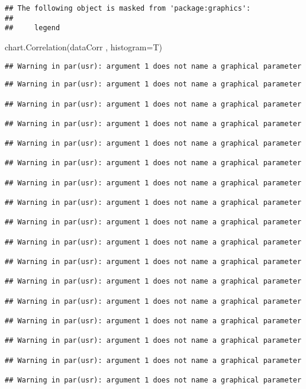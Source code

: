 \documentclass[
]{article}
\newenvironment{Shaded}{\begin{snugshade}}{\end{snugshade}}
\newcommand{\AttributeTok}[1]{\textcolor[rgb]{0.77,0.63,0.00}{#1}}
\newcommand{\FunctionTok}[1]{\textcolor[rgb]{0.00,0.00,0.00}{#1}}
\newcommand{\NormalTok}[1]{#1}
\begin{document}
\begin{verbatim}
## The following object is masked from 'package:graphics':
## 
##     legend
\end{verbatim}

\begin{Shaded}
\begin{Highlighting}[]
\FunctionTok{chart.Correlation}\NormalTok{(dataCorr , }\AttributeTok{histogram=}\NormalTok{T)}
\end{Highlighting}
\end{Shaded}

\begin{verbatim}
## Warning in par(usr): argument 1 does not name a graphical parameter
\end{verbatim}

\begin{verbatim}
## Warning in par(usr): argument 1 does not name a graphical parameter

## Warning in par(usr): argument 1 does not name a graphical parameter

## Warning in par(usr): argument 1 does not name a graphical parameter

## Warning in par(usr): argument 1 does not name a graphical parameter

## Warning in par(usr): argument 1 does not name a graphical parameter

## Warning in par(usr): argument 1 does not name a graphical parameter

## Warning in par(usr): argument 1 does not name a graphical parameter

## Warning in par(usr): argument 1 does not name a graphical parameter

## Warning in par(usr): argument 1 does not name a graphical parameter

## Warning in par(usr): argument 1 does not name a graphical parameter

## Warning in par(usr): argument 1 does not name a graphical parameter

## Warning in par(usr): argument 1 does not name a graphical parameter

## Warning in par(usr): argument 1 does not name a graphical parameter

## Warning in par(usr): argument 1 does not name a graphical parameter

## Warning in par(usr): argument 1 does not name a graphical parameter

## Warning in par(usr): argument 1 does not name a graphical parameter


\end{verbatim}
\end{document}
